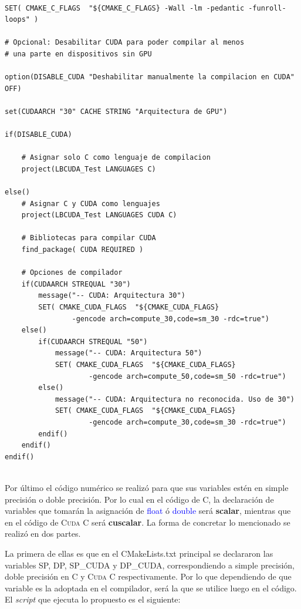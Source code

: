 {\scriptsize
	\begin{frame}{}
		\begin{lstlisting}[frame=single]

SET( CMAKE_C_FLAGS  "${CMAKE_C_FLAGS} -Wall -lm -pedantic -funroll-loops" )

# Opcional: Desabilitar CUDA para poder compilar al menos
# una parte en dispositivos sin GPU

option(DISABLE_CUDA "Deshabilitar manualmente la compilacion en CUDA" OFF)

set(CUDAARCH "30" CACHE STRING "Arquitectura de GPU")

if(DISABLE_CUDA)

	# Asignar solo C como lenguaje de compilacion
	project(LBCUDA_Test LANGUAGES C)

else()
	# Asignar C y CUDA como lenguajes
	project(LBCUDA_Test LANGUAGES CUDA C)
	
	# Bibliotecas para compilar CUDA
	find_package( CUDA REQUIRED )

	# Opciones de compilador
	if(CUDAARCH STREQUAL "30")
		message("-- CUDA: Arquitectura 30")
		SET( CMAKE_CUDA_FLAGS  "${CMAKE_CUDA_FLAGS} 
				-gencode arch=compute_30,code=sm_30 -rdc=true")
	else()
		if(CUDAARCH STREQUAL "50")
			message("-- CUDA: Arquitectura 50")      
			SET( CMAKE_CUDA_FLAGS  "${CMAKE_CUDA_FLAGS} 
					-gencode arch=compute_50,code=sm_50 -rdc=true")
		else()
			message("-- CUDA: Arquitectura no reconocida. Uso de 30")
			SET( CMAKE_CUDA_FLAGS  "${CMAKE_CUDA_FLAGS} 
					-gencode arch=compute_30,code=sm_30 -rdc=true")      
		endif()
	endif()
endif()
		
		\end{lstlisting}
		
	\end{frame}
}

Por último el código numérico se realizó para que sus variables estén en simple precisión o doble precisión. Por lo cual en el código de \textsc{C}, la declaración de variables que tomarán la asignación de \textcolor{blue}{float} ó \textcolor{blue}{double} será \textbf{scalar}, mientras que en el código de \textsc{Cuda C} será \textbf{cuscalar}. La forma de concretar lo mencionado se realizó en dos partes.

La primera de ellas es que en el CMakeLists.txt principal se declararon las variables SP, DP, SP\_CUDA y DP\_CUDA, correspondiendo a simple precisión, doble precisión en \textsc{C} y \textsc{Cuda C} respectivamente. Por lo que dependiendo de que variable es la adoptada en el compilador, será la que se utilice luego en el código. El \textit{script} que ejecuta lo propuesto es el siguiente:

